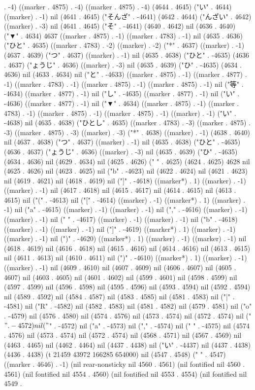 . -4) ((marker . 4875) . -4) ((marker . 4875) . -4) (4644 . 4645) ("い" . 4644) ((marker) . -1) nil (4641 . 4645) ("そんざ" . -4641) (4642 . 4644) ("んざい" . 4642) ((marker) . -3) nil (4641 . 4645) ("そ" . -4641) (4640 . 4642) nil (4636 . 4640) ("▼" . 4634) 4637 ((marker . 4875) . -1) ((marker . 4783) . -1) nil (4635 . 4636) ("ひと" . 4635) ((marker . 4783) . -2) ((marker) . -2) ("*" . 4637) ((marker) . -1) (4637 . 4639) ("つ" . 4637) ((marker) . -1) nil (4635 . 4638) ("ひと" . -4635) (4636 . 4637) ("ょうじ" . 4636) ((marker) . -3) nil (4635 . 4639) ("ひ" . -4635) (4634 . 4636) nil (4633 . 4634) nil ("と" . -4633) ((marker . 4875) . -1) ((marker . 4877) . -1) ((marker . 4783) . -1) ((marker . 4875) . -1) ((marker . 4875) . -1) nil ("等" . -4634) ((marker . 4877) . -1) nil ("し" . -4635) ((marker . 4877) . -1) nil ("い" . -4636) ((marker . 4877) . -1) nil ("▼" . 4634) ((marker . 4875) . -1) ((marker . 4783) . -1) ((marker . 4875) . -1) ((marker . 4875) . -1) ((marker) . -1) ("い" . -4638) nil (4635 . 4638) ("ひとし" . 4635) ((marker . 4783) . -3) ((marker . 4875) . -3) ((marker . 4875) . -3) ((marker) . -3) ("*" . 4638) ((marker) . -1) (4638 . 4640) nil (4637 . 4638) ("つ" . 4637) ((marker) . -1) nil (4635 . 4638) ("ひと" . -4635) (4636 . 4637) ("ょうじ" . 4636) ((marker) . -3) nil (4635 . 4639) ("ひ" . -4635) (4634 . 4636) nil (4629 . 4634) nil (4625 . 4626) (" " . 4625) (4624 . 4625) 4628 nil (4625 . 4626) nil (4623 . 4625) nil ("b" . -4623) nil (4622 . 4624) nil (4621 . 4623) nil (4619 . 4621) nil (4618 . 4619) nil ("]" . -4618) ((marker*) . 1) ((marker) . -1) ((marker) . -1) nil (4617 . 4618) nil (4615 . 4617) nil (4614 . 4615) nil (4613 . 4615) nil ("(" . -4613) nil ("[" . -4614) ((marker) . -1) ((marker*) . 1) ((marker) . -1) nil ("a" . -4615) ((marker) . -1) ((marker) . -1) nil ("," . -4616) ((marker) . -1) ((marker) . -1) nil (" " . -4617) ((marker) . -1) ((marker) . -1) nil ("b" . -4618) ((marker) . -1) ((marker) . -1) nil ("]" . -4619) ((marker*) . 1) ((marker) . -1) ((marker) . -1) nil (")" . -4620) ((marker*) . 1) ((marker) . -1) ((marker) . -1) nil (4618 . 4619) nil (4616 . 4618) nil (4615 . 4616) nil (4614 . 4616) nil (4613 . 4615) nil (4611 . 4613) nil (4610 . 4611) nil (")" . -4610) ((marker*) . 1) ((marker) . -1) ((marker) . -1) nil (4609 . 4610) nil (4607 . 4609) nil (4606 . 4607) nil (4605 . 4607) nil (4603 . 4605) nil (4601 . 4602) nil (4599 . 4601) nil (4598 . 4599) nil (4597 . 4599) nil (4596 . 4598) nil (4595 . 4596) nil (4593 . 4594) nil (4592 . 4594) nil (4589 . 4592) nil (4584 . 4587) nil (4583 . 4585) nil (4581 . 4583) nil ("|" . -4581) nil ("R" . -4582) nil (4582 . 4583) nil (4581 . 4582) nil (4579 . 4581) nil ("o" . -4579) nil (4576 . 4580) nil (4574 . 4576) nil (4573 . 4574) nil (4572 . 4574) nil ("$" . -4572) nil ("$" . -4572) nil ("a" . -4573) nil ("," . -4574) nil (" " . -4575) nil (4574 . 4576) nil (4573 . 4574) nil (4572 . 4574) nil (4568 . 4571) nil (4567 . 4569) nil (4463 . 4465) nil (4462 . 4464) nil (4437 . 4438) nil ("い" . -4437) nil (4437 . 4438) (4436 . 4438) (t 21459 43972 166285 654000) nil (4547 . 4548) ("  " . 4547) ((marker . 4646) . -1) (nil rear-nonsticky nil 4560 . 4561) (nil fontified nil 4560 . 4561) (nil fontified nil 4554 . 4560) (nil fontified nil 4553 . 4554) (nil fontified nil 4549 . 